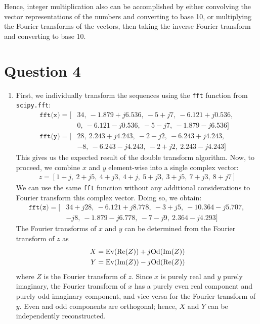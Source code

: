 \documentclass[a4paper, 11pt]{article}
\begin{document}
Hence, integer multiplication also can be accomplished by either convolving the
vector representations of the numbers and converting to base 10, or multiplying
the Fourier transforms of the vectors, then taking the inverse Fourier transform
and converting to base 10.

\newpage
\section*{Question 4}

\begin{enumerate}[label=\alph*)]

    \item First, we individually transform the sequences using the \texttt{fft}
    function from \texttt{scipy.fft}:
    \begin{align*}
        \texttt{fft(x)} = [&34,\ -1.879+j6.536,\ -5+j7,\ -6.121+j0.536,\ \\
                           &0,\ -6.121-j0.536,\ -5-j7,\ -1.879-j6.536] \\
        \texttt{fft(y)} = [&28,\ 2.243+j4.243,\ -2-j2,\ -6.243+j4.243,\ \\
                           &-8,\ -6.243-j4.243,\ -2+j2,\ 2.243-j4.243]
    \end{align*}
    This gives us the expected result of the double transform algorithm. Now, to
    proceed, we combine $x$ and $y$ element-wise into a single complex vector:
    \begin{align*}
        z = [1+j,\ 2+j5,\ 4+j3,\ 4+j,\ 5+j3,\ 3+j5,\ 7+j3,\ 8+j7]
    \end{align*}
    We can use the same \texttt{fft} function without any additional
    considerations to Fourier transform this complex vector. Doing so, we
    obtain:
    \begin{align*}
        \texttt{fft(z)} = [&34+j28,\ -6.121+j8.778,\ -3+j5,\ -10.364-j5.707,\ \\
                           &-j8,\ -1.879-j6.778,\ -7-j9,\ 2.364-j4.293]
    \end{align*}
    The Fourier transforms of $x$ and $y$ can be determined from the
    Fourier transform of $z$ as
    \begin{align*}
        X &= \text{Ev}(\Re(Z)) + j\text{Od}(\Im(Z)) \\
        Y &= \text{Ev}(\Im(Z)) - j\text{Od}(\Re(Z))
    \end{align*}
    where $Z$ is the Fourier transform of $z$. Since $x$ is purely real and $y$
    purely imaginary, the Fourier transform of $x$ has a purely even real
    component and purely odd imaginary component, and vice versa for the Fourier
    transform of $y$. Even and odd components are orthogonal; hence, $X$ and $Y$
    can be independently reconstructed.


\end{enumerate}
\end{document}
